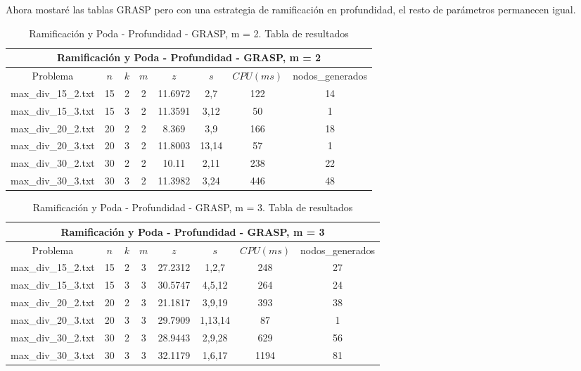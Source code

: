 \clearpage
Ahora mostaré las tablas GRASP pero con una estrategia de ramificación en profundidad, el resto de parámetros permanecen igual.

   \begin{table}[h]
   {\small
   \begin{center}
   \begin{tabular}{cccccccc}
      \multicolumn{8}{c}{Ramificación y Poda - Profundidad - GRASP, m = 2} \\
      \hline
      Problema & $n$ & $k$ & $m$ & $z$ & $s$ & $CPU(ms)$ & nodos\_generados \\
      \hline
      max\_div\_15\_2.txt & 15 & 2 & 2 & 11.6972 & 2,7 & 122 & 14 \\
      max\_div\_15\_3.txt & 15 & 3 & 2 & 11.3591 & 3,12 & 50 & 1 \\
      max\_div\_20\_2.txt & 20 & 2 & 2 & 8.369 & 3,9 & 166 & 18 \\
      max\_div\_20\_3.txt & 20 & 3 & 2 & 11.8003 & 13,14 & 57 & 1 \\
      max\_div\_30\_2.txt & 30 & 2 & 2 & 10.11 & 2,11 & 238 & 22 \\
      max\_div\_30\_3.txt & 30 & 3 & 2 & 11.3982 & 3,24 & 446 & 48 \\
      \hline
   \end{tabular}
   \end{center}
   }
   \caption{Ramificación y Poda - Profundidad - GRASP, m = 2. Tabla de resultados}
   \end{table}

   \begin{table}[h]
   {\small
   \begin{center}
   \begin{tabular}{cccccccc}
      \multicolumn{8}{c}{Ramificación y Poda - Profundidad - GRASP, m = 3} \\
      \hline
      Problema & $n$ & $k$ & $m$ & $z$ & $s$ & $CPU(ms)$ & nodos\_generados \\
      \hline
      max\_div\_15\_2.txt & 15 & 2 & 3 & 27.2312 & 1,2,7 & 248 & 27 \\
      max\_div\_15\_3.txt & 15 & 3 & 3 & 30.5747 & 4,5,12 & 264 & 24 \\
      max\_div\_20\_2.txt & 20 & 2 & 3 & 21.1817 & 3,9,19 & 393 & 38 \\
      max\_div\_20\_3.txt & 20 & 3 & 3 & 29.7909 & 1,13,14 & 87 & 1 \\
      max\_div\_30\_2.txt & 30 & 2 & 3 & 28.9443 & 2,9,28 & 629 & 56 \\
      max\_div\_30\_3.txt & 30 & 3 & 3 & 32.1179 & 1,6,17 & 1194 & 81 \\
      \hline
   \end{tabular}
   \end{center}
   }
   \caption{Ramificación y Poda - Profundidad - GRASP, m = 3. Tabla de resultados}
   \end{table}

